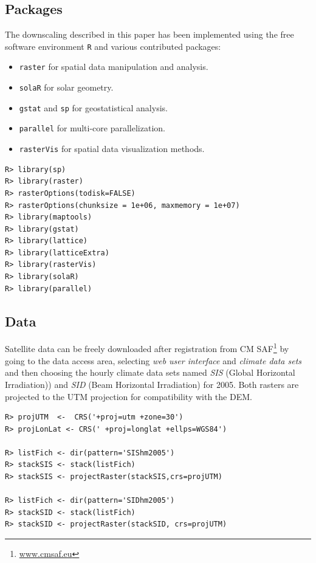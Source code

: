 \documentclass[11pt, english]{article}
\let\cite\citep
\begin{document}
\subsection{Packages}
\label{sec-1-1}

The downscaling described in this paper has been implemented using the
free software environment \texttt{R}
\cite{proglangRDevelopmentCoreTeam2013} and various contributed
packages:

\begin{itemize}
\item \texttt{raster} \cite{Hijmans.Etten2013} for spatial data manipulation
and analysis.
\item \texttt{solaR} \cite{Perpinan-Lamigueiro2012} for solar
geometry.
\item \texttt{gstat} \cite{Pebesma.Graeler2013} and \texttt{sp}
\cite{Pebesma.Bivand.ea2013} for geostatistical analysis.
\item \texttt{parallel} for multi-core parallelization.
\item \texttt{rasterVis} \cite{Perpinan-Lamiguiero.Hijmans2013} for spatial data
visualization methods.
\end{itemize}

\lstset{language=R,numbers=none}
\begin{lstlisting} 
R> library(sp)
R> library(raster)
R> rasterOptions(todisk=FALSE)
R> rasterOptions(chunksize = 1e+06, maxmemory = 1e+07)
R> library(maptools)
R> library(gstat)
R> library(lattice)
R> library(latticeExtra)
R> library(rasterVis)
R> library(solaR)
R> library(parallel)
\end{lstlisting}

\subsection{Data}
\label{sec-1-2}

Satellite data can be freely downloaded after registration from CM
SAF\footnote{\url{www.cmsaf.eu}} by going to the data access area,
selecting \emph{web user interface} and \emph{climate data sets} and
then choosing the hourly climate data sets named \emph{SIS} (Global
Horizontal Irradiation)) and \emph{SID} (Beam Horizontal Irradiation)
for 2005. Both rasters are projected to the UTM projection for
compatibility with the DEM.

\lstset{language=R,numbers=none}
\begin{lstlisting} 
R> projUTM  <-  CRS('+proj=utm +zone=30')
R> projLonLat <- CRS(' +proj=longlat +ellps=WGS84')

R> listFich <- dir(pattern='SIShm2005')
R> stackSIS <- stack(listFich)
R> stackSIS <- projectRaster(stackSIS,crs=projUTM)

R> listFich <- dir(pattern='SIDhm2005')
R> stackSID <- stack(listFich)
R> stackSID <- projectRaster(stackSID, crs=projUTM)
\end{lstlisting}
\end{document}
